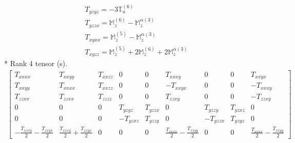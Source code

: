 \documentclass[fleqn,8pt,landscape]{jsarticle}
\begin{document}
\begin{align*}
& T_{yzyz} = - 3 \mathbb{T}_{u}^{(6)} \\
& T_{yzzx} = \mathbb{M}_{z}^{(6)} - \mathbb{M}_{z}^{\alpha(3)} \\
& T_{xyxx} = \mathbb{M}_{z}^{(5)} - \mathbb{M}_{z}^{\alpha(3)} \\
& T_{xyzz} = \mathbb{M}_{z}^{(5)} + 2 \mathbb{M}_{z}^{(6)} + 2 \mathbb{M}_{z}^{\alpha(3)}
\end{align*}
* Rank 4 tensor (s).
\begin{align*}
\begin{bmatrix} T_{xxxx} & T_{xxyy} & T_{xxzz} & 0 & 0 & T_{xxxy} & 0 & 0 & T_{xxyx} \\ T_{xxyy} & T_{xxxx} & T_{xxzz} & 0 & 0 & - T_{xxyx} & 0 & 0 & - T_{xxxy} \\ T_{zzxx} & T_{zzxx} & T_{zzzz} & 0 & 0 & T_{zzxy} & 0 & 0 & - T_{zzxy} \\ 0 & 0 & 0 & T_{yzyz} & T_{yzzx} & 0 & T_{yzzy} & T_{yzxz} & 0 \\ 0 & 0 & 0 & - T_{yzxz} & T_{yzzy} & 0 & - T_{yzzx} & T_{yzyz} & 0 \\ - \frac{T_{xxxy}}{2} - \frac{T_{xxyx}}{2} & \frac{T_{xxxy}}{2} + \frac{T_{xxyx}}{2} & 0 & 0 & 0 & \frac{T_{xxxx}}{2} - \frac{T_{xxyy}}{2} & 0 & 0 & \frac{T_{xxxx}}{2} - \frac{T_{xxyy}}{2} \end{bmatrix}
\end{align*}
\end{document}
